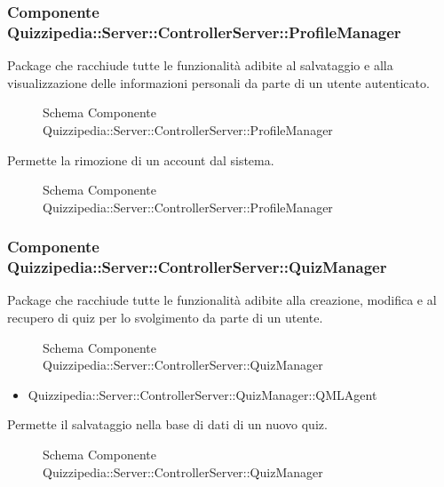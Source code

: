 \subsubsection{Componente Quizzipedia::Server::ControllerServer::ProfileManager}
Package che racchiude tutte le funzionalità adibite al salvataggio e alla visualizzazione delle informazioni personali da parte di un utente autenticato.
\begin{figure}[H]
\centering
\noindent{}
\caption{Schema Componente Quizzipedia::Server::ControllerServer::ProfileManager}
\end{figure}
Permette la rimozione di un account dal sistema.
\begin{figure}[H]
\centering
\noindent{}
\caption{Schema Componente Quizzipedia::Server::ControllerServer::ProfileManager}
\end{figure}
\subsubsection{Componente Quizzipedia::Server::ControllerServer::QuizManager}
Package che racchiude tutte le funzionalità adibite alla creazione, modifica e al recupero di quiz per lo svolgimento da parte di un utente.
\begin{figure}[H]
\centering
\noindent{}
\caption{Schema Componente Quizzipedia::Server::ControllerServer::QuizManager}
\end{figure}
\begin{itemize}
\item Quizzipedia::Server::ControllerServer::QuizManager::QMLAgent
\end{itemize}
Permette il salvataggio nella base di dati di un nuovo quiz.
\begin{figure}[H]
\centering
\noindent{}
\caption{Schema Componente Quizzipedia::Server::ControllerServer::QuizManager}
\end{figure}
